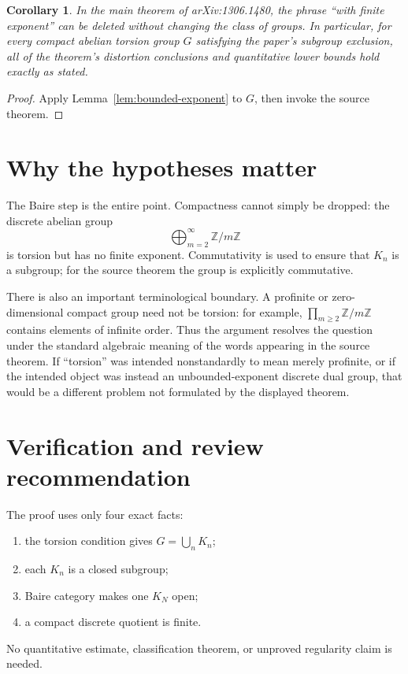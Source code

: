 \documentclass[11pt]{article}
\newtheorem{corollary}{Corollary}
\begin{document}
\begin{corollary}\label{cor:source}
In the main theorem of arXiv:1306.1480, the phrase ``with finite exponent''
can be deleted without changing the class of groups.  In particular, for
every compact abelian torsion group $G$ satisfying the paper's subgroup
exclusion, all of the theorem's distortion conclusions and quantitative
lower bounds hold exactly as stated.
\end{corollary}

\begin{proof}
Apply Lemma~\ref{lem:bounded-exponent} to $G$, then invoke the source theorem.
\end{proof}

\section{Why the hypotheses matter}

The Baire step is the entire point.  Compactness cannot simply be dropped:
the discrete abelian group
\[
  \bigoplus_{m=2}^{\infty}\mathbb Z/m\mathbb Z
\]
is torsion but has no finite exponent.  Commutativity is used to ensure that
$K_n$ is a subgroup; for the source theorem the group is explicitly
commutative.

There is also an important terminological boundary.  A profinite or
zero-dimensional compact group need not be torsion: for example,
$\prod_{m\ge2}\mathbb Z/m\mathbb Z$ contains elements of infinite order.
Thus the argument resolves the question under the standard algebraic
meaning of the words appearing in the source theorem.  If ``torsion'' was
intended nonstandardly to mean merely profinite, or if the intended object
was instead an unbounded-exponent discrete dual group, that would be a
different problem not formulated by the displayed theorem.

\section{Verification and review recommendation}

The proof uses only four exact facts:
\begin{enumerate}
  \item the torsion condition gives $G=\bigcup_n K_n$;
  \item each $K_n$ is a closed subgroup;
  \item Baire category makes one $K_N$ open;
  \item a compact discrete quotient is finite.
\end{enumerate}
No quantitative estimate, classification theorem, or unproved regularity
claim is needed.
\end{document}
